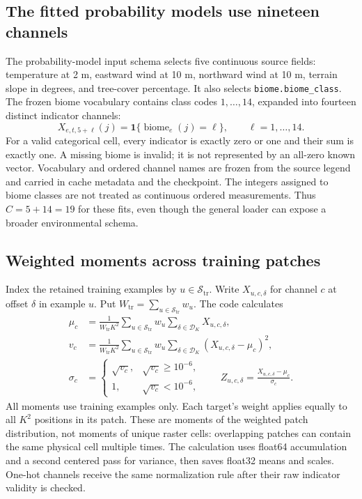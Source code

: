 \documentclass[11pt,a4paper]{article}
\newcommand{\Ind}{\mathbf{1}}
\begin{document}
\subsection{The fitted probability models use nineteen channels}

The probability-model input schema selects five continuous source fields:
temperature at 2 m, eastward wind at 10 m, northward wind at 10 m, terrain
slope in degrees, and tree-cover percentage. It also selects
\texttt{biome.biome\_class}. The frozen biome vocabulary contains class
codes $1,\ldots,14$, expanded into fourteen distinct indicator channels:
\begin{equation}
 X_{e,t,5+\ell}(j)=\Ind\{\operatorname{biome}_e(j)=\ell\},
 \qquad \ell=1,\ldots,14.
\end{equation}
For a valid categorical cell, every indicator is exactly zero or one and
their sum is exactly one. A missing biome is invalid; it is not represented
by an all-zero known vector. Vocabulary and ordered channel names are frozen
from the source legend and carried in cache metadata and the checkpoint.
The integers assigned to biome classes are not treated as continuous ordered
measurements. Thus $C=5+14=19$ for these fits, even though the general loader
can expose a broader environmental schema.

\subsection{Weighted moments across training patches}

Index the retained training examples by $u\in\mathcal S_{\mathrm{tr}}$.
Write $X_{u,c,\delta}$ for channel $c$ at offset $\delta$ in example $u$.
Put $W_{\mathrm{tr}}=\sum_{u\in\mathcal S_{\mathrm{tr}}}w_u$. The code calculates
\begin{align}
 \mu_c&=\frac{1}{W_{\mathrm{tr}}K^2}
   \sum_{u\in\mathcal S_{\mathrm{tr}}}w_u
   \sum_{\delta\in\mathcal D_K}X_{u,c,\delta},\\
 v_c&=\frac{1}{W_{\mathrm{tr}}K^2}
   \sum_{u\in\mathcal S_{\mathrm{tr}}}w_u
   \sum_{\delta\in\mathcal D_K}(X_{u,c,\delta}-\mu_c)^2,\\
 \sigma_c&=\begin{cases}\sqrt{v_c},&\sqrt{v_c}\geq10^{-6},\\
                           1,&\sqrt{v_c}<10^{-6},\end{cases}\qquad
 Z_{u,c,\delta}=\frac{X_{u,c,\delta}-\mu_c}{\sigma_c}.
 \label{eq:prob-normalization}
\end{align}
All moments use training examples only. Each target's weight applies equally
to all $K^2$ positions in its patch. These are moments of the weighted patch
distribution, not moments of unique raster cells: overlapping patches can
contain the same physical cell multiple times. The calculation uses float64
accumulation and a second centered pass for variance, then saves float32
means and scales. One-hot channels receive the same normalization rule after
their raw indicator validity is checked.
\end{document}
